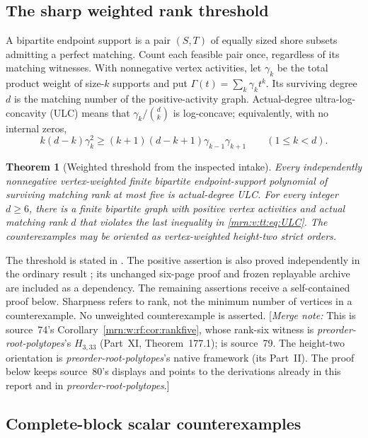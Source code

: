 \documentclass[11pt,a4paper]{article}
\newtheorem{theorem}{Theorem}[section]
\theoremstyle{remark}\newtheorem{remark}[theorem]{Remark}
\newcommand{\mnote}[1]{[\textit{Merge note:} #1]}
\newcommand{\prp}{\emph{preorder-root-polytopes}}
\begin{document}
\subsection{The sharp weighted rank threshold}\label{mrn:v:tt:sec:threshold}
A bipartite endpoint support is a pair $(S,T)$ of equally sized shore subsets admitting a perfect matching. Count each feasible pair once, regardless of its matching witnesses. With nonnegative vertex activities, let $\gamma_k$ be the total product weight of size-$k$ supports and put $\Gamma(t)=\sum_k\gamma_kt^k$. Its surviving degree $d$ is the matching number of the positive-activity graph. Actual-degree ultra-log-concavity (ULC) means that $\gamma_k/\binom dk$ is log-concave; equivalently, with no internal zeros,
\begin{equation}\label{mrn:v:tt:eq:ULC}
 k(d-k)\gamma_k^2\ge(k+1)(d-k+1)\gamma_{k-1}\gamma_{k+1}
 \qquad(1\le k<d).
\end{equation}
\begin{theorem}[Weighted threshold from the inspected intake]\label{mrn:v:tt:thm:sharp}
Every independently nonnegative vertex-weighted finite bipartite endpoint-support polynomial of surviving matching rank at most five is actual-degree ULC. For every integer $d\ge6$, there is a finite bipartite graph with positive vertex activities and actual matching rank $d$ that violates the last inequality in \eqref{mrn:v:tt:eq:ULC}. The counterexamples may be oriented as vertex-weighted height-two strict orders.
\end{theorem}
The threshold is stated in \cite[Corollary 1.2 and \texttt{negative\_ranks.tex}]{b:m74}. The positive assertion is also proved independently in the ordinary result \cite[Corollary 5.2]{b:m79}; its unchanged six-page proof and frozen replayable archive are included as a dependency. The remaining assertions receive a self-contained proof below. Sharpness refers to rank, not the minimum number of vertices in a counterexample. No unweighted counterexample is asserted.
\mnote{This is source~74's Corollary~\ref{mrn:w:rf:cor:rankfive}, whose
rank-six witness is \prp's $H_{3,33}$ (Part~XI, Theorem~177.1); \cite{b:m79} is
source~79. The height-two orientation is \prp's native framework (its Part~II).
The proof below keeps source~80's displays and points to the derivations
already in this report and in \prp.}


\subsection{Complete-block scalar counterexamples}\label{mrn:v:tt:sec:scalar}
\end{document}

